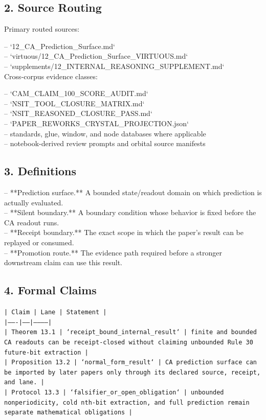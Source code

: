 \documentclass[11pt]{article}
\begin{document}
\subsection*{2. Source Routing}

Primary routed sources:

\noindent{}-- `12\_CA\_Prediction\_Surface.md`\\
\noindent{}-- `virtuous/12\_CA\_Prediction\_Surface\_VIRTUOUS.md`\\
\noindent{}-- `supplements/12\_INTERNAL\_REASONING\_SUPPLEMENT.md`\\

Cross-corpus evidence classes:

\noindent{}-- `CAM\_CLAIM\_100\_SCORE\_AUDIT.md`\\
\noindent{}-- `NSIT\_TOOL\_CLOSURE\_MATRIX.md`\\
\noindent{}-- `NSIT\_REASONED\_CLOSURE\_PASS.md`\\
\noindent{}-- `PAPER\_REWORKS\_CRYSTAL\_PROJECTION.json`\\
\noindent{}-- standards, glue, window, and node databases where applicable\\
\noindent{}-- notebook-derived review prompts and orbital source manifests\\

\subsection*{3. Definitions}

\noindent{}-- **Prediction surface.** A bounded state/readout domain on which prediction is actually evaluated.\\
\noindent{}-- **Silent boundary.** A boundary condition whose behavior is fixed before the CA readout runs.\\
\noindent{}-- **Receipt boundary.** The exact scope in which the paper's result can be replayed or consumed.\\
\noindent{}-- **Promotion route.** The evidence path required before a stronger downstream claim can use this result.\\

\subsection*{4. Formal Claims}

\noindent\texttt{| Claim | Lane | Statement |}\\
\noindent\texttt{|-------|------|-----------|}\\
\noindent\texttt{| Theorem 13.1 | `receipt\_bound\_internal\_result` | finite and bounded CA readouts can be receipt-closed without claiming unbounded Rule 30 future-bit extraction |}\\
\noindent\texttt{| Proposition 13.2 | `normal\_form\_result` | CA prediction surface can be imported by later papers only through its declared source, receipt, and lane. |}\\
\noindent\texttt{| Protocol 13.3 | `falsifier\_or\_open\_obligation` | unbounded nonperiodicity, cold nth-bit extraction, and full prediction remain separate mathematical obligations |}\\
\end{document}
